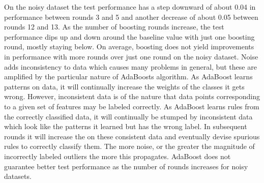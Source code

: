\documentclass[12pt,letterpaper]{article}
\begin{document}
\begin{enumerate}
\begin{enumerate}
{\begin{enumerate}
On the noisy dataset the test performance has a step downward of about 0.04 in performance between rounds 3 and 5 and another decrease of about 0.05 between rounds 12 and 13. As the number of boosting rounds increase, the test performance dips up and down around the baseline value with just one boosting round, mostly staying below. On average, boosting does not yield improvements in performance with more rounds over just one round on the noisy dataset. Noise adds inconsistency to data which causes many problems in general, but these are amplified by the particular nature of AdaBoosts algorithm. As AdaBoost learns patterns on data, it will continually increase the weights of the classes it gets wrong. However, inconsistent data is of the nature that data points corresponding to a given set of features may be labeled correctly. As AdaBoost learns rules from the correctly classified data, it will continually be stumped by inconsistent data which look like the patterns it learned but has the wrong label. In subsequent rounds it will increase the on these consistent data and eventually devise spurious rules to correctly classify them. The more noise, or the greater the magnitude of incorrectly labeled outliers the more this propagates. AdaBoost does not guarantee better test performance as the number of rounds increases for noisy datasets. \\ \medskip 


\end{enumerate}}
\end{enumerate}
\end{enumerate}
\end{document}
